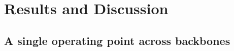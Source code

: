 \documentclass{article}
\begin{document}
\section{Results and Discussion}
\label{sec:results}

\subsection{A single operating point across backbones}

\begin{table}[t]
\centering
\caption{Post-processor comparison. Direct rows are absolute percentages;
others are percentage-point changes. Default CASM/PLPDP use $[55,215]$ BPM;
their SMC-opt rows use $[30,300]$ BPM. DBN-SMC-opt follows
Sec.~\ref{sec:exp}; all SMC-opt rows are target-selected diagnostics.}
\label{tab:postprocessor_ablation}
\begingroup
\fontsize{7.5pt}{9pt}\selectfont
\setlength{\tabcolsep}{3.2pt}
\renewcommand{\arraystretch}{1.0}
\end{table}
\end{document}
